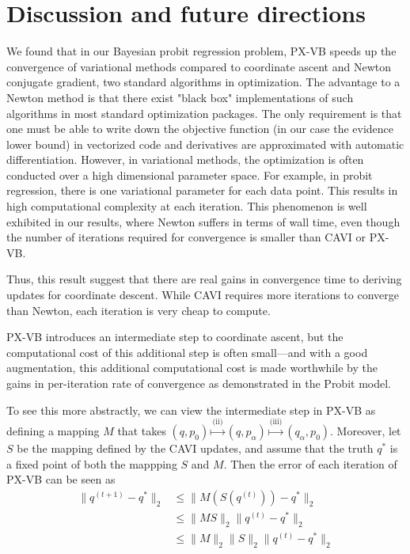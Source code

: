 \documentclass{article}
\begin{document}
\section{Discussion and future directions}
We found that in our Bayesian probit regression problem, PX-VB speeds up the convergence of variational methods compared to coordinate ascent and Newton conjugate gradient, two standard algorithms in optimization. The advantage to a Newton method is that there exist "black box" implementations of such algorithms in most standard optimization packages. The only requirement is that one must be able to write down the objective function (in our case the evidence lower bound) in vectorized code and derivatives are approximated with automatic differentiation. However, in variational methods, the optimization is often conducted over a high dimensional parameter space. For example, in probit regression, there is one variational parameter for each data point. This results in high computational complexity at each iteration. This phenomenon is well exhibited in our results, where Newton suffers in terms of wall time, even though the number of iterations required for convergence is smaller than CAVI or PX-VB. 

Thus, this result suggest that there are real gains in convergence time to deriving updates for coordinate descent. While CAVI requires more iterations to converge than Newton, each iteration is very cheap to compute. 

PX-VB introduces an intermediate step to coordinate ascent, but the computational cost of this additional step is often small---and with a good augmentation, this additional computational cost is made worthwhile by the gains in per-iteration rate of convergence as demonstrated in the Probit model.

To see this more abstractly, we can view the intermediate step in PX-VB as defining a mapping $M$ that takes $(q, p_0) \stackrel{\text{(ii)}}{\mapsto} (q, p_\alpha) \stackrel{\text{(iii)}}{\mapsto} (q_\alpha, p_0)$. Moreover, let $S$ be the mapping defined by the CAVI updates, and assume that the truth $q^*$ is a fixed point of both the mappping $S$ and $M$. Then the error of each iteration of PX-VB can be seen as
\begin{align}
\|q^{(t+1)} - q^*\|_2 &\leq \| M(S(q^{(t)})) - q^*\|_2 \\
&\leq \|MS\|_2 \|q^{(t)} - q^*\|_2\\
&\leq \|M\|_2\|S\|_2 \|q^{(t)} - q^*\|_2
\end{align}
\end{document}
